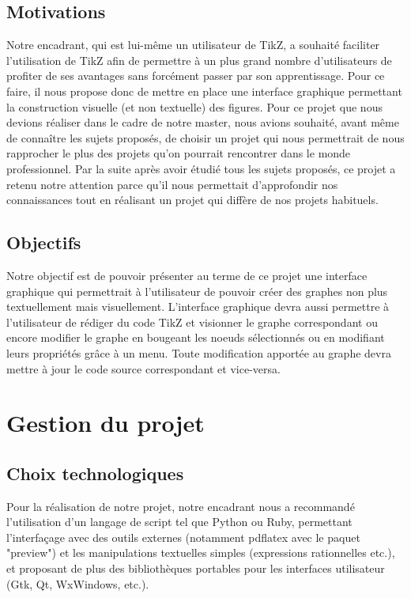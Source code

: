 \documentclass[a4paper]{report}
\begin{document}
  \subsection{Motivations}
  Notre encadrant, qui est lui-même un utilisateur de TikZ, a souhaité faciliter l'utilisation de TikZ afin de permettre à un plus grand nombre d'utilisateurs de profiter de ses avantages sans forcément passer par son apprentissage. Pour ce faire, il nous propose donc de mettre en place une interface graphique permettant la construction  visuelle (et non textuelle) des figures.
  \newline
  Pour ce projet que nous devions réaliser dans le cadre de notre master, nous avions souhaité, avant même de 
connaître les sujets proposés, de choisir un projet qui nous permettrait de nous rapprocher le plus des projets qu'on pourrait rencontrer dans le monde professionnel. Par la suite après avoir étudié tous les sujets proposés, ce projet a retenu notre attention parce qu'il nous permettait d'approfondir nos connaissances tout en réalisant un projet qui diffère de nos projets habituels.
  \subsection{Objectifs}
  Notre objectif est de pouvoir présenter au terme de ce projet une interface graphique qui permettrait à l'utilisateur de pouvoir créer des graphes non plus textuellement mais visuellement. L'interface graphique devra aussi permettre à l'utilisateur de rédiger du code TikZ et visionner le graphe correspondant ou encore modifier le graphe en bougeant les noeuds sélectionnés ou en modifiant leurs propriétés grâce à un menu.
Toute modification apportée au graphe devra mettre à jour le code source correspondant et vice-versa. 
  \section {Gestion du projet}
  \subsection{Choix technologiques}
  Pour la réalisation de notre projet, notre encadrant nous a recommandé l'utilisation d'un langage de script tel que Python ou Ruby, permettant l'interfaçage avec des outils externes (notamment pdflatex avec le paquet "preview") et les manipulations textuelles simples (expressions rationnelles etc.), et proposant de plus des bibliothèques portables pour les interfaces utilisateur (Gtk, Qt, WxWindows, etc.).
\end{document}
